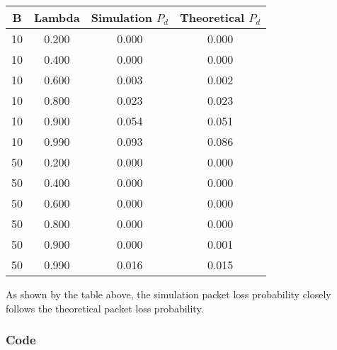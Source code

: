 \documentclass{article}
\begin{document}
\section{}
\begin{center}
\begin{tabular}{c | c | c | c}
    B   & Lambda  & Simulation $P_d$    & Theoretical $P_d$ \\
    \hline
    10  & 0.200   & 0.000   & 0.000 \\
    10  & 0.400   & 0.000   & 0.000 \\
    10  & 0.600   & 0.003   & 0.002 \\ 
    10  & 0.800   & 0.023   & 0.023 \\
    10  & 0.900   & 0.054   & 0.051 \\
    10  & 0.990   & 0.093   & 0.086 \\
    50  & 0.200   & 0.000   & 0.000 \\
    50  & 0.400   & 0.000   & 0.000 \\
    50  & 0.600   & 0.000   & 0.000 \\
    50  & 0.800   & 0.000   & 0.000 \\
    50  & 0.900   & 0.000   & 0.001 \\
    50  & 0.990   & 0.016   & 0.015 \\
\end{tabular}
\end{center}
As shown by the table above, the simulation packet loss probability closely follows the theoretical packet loss probability.

\section*{Code}


\part{}	
\end{document}
